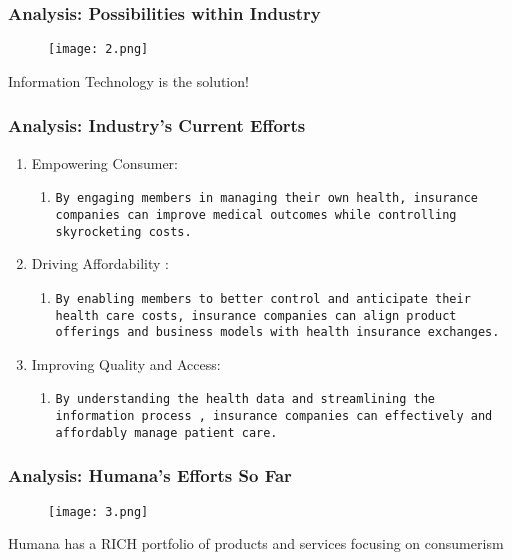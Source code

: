 \documentclass[compress,handout,10pt]{beamer}
\let\olditem\item
\renewcommand{\item}{\setlength{\itemsep}{0.5\baselineskip}\olditem}
\begin{document}
\begin{frame}[dresden]
   \frametitle{Analysis: Possibilities within Industry}
\begin{figure}[h]
    \begin{center}
        \texttt{[image: 2.png]}
    \end{center}
    \caption{}
    \label{fig:seats}
\end{figure}
    \begin{center}
Information Technology is the solution! 
   \end{center}
\end{frame}


\begin{frame}
    \frametitle{Analysis: Industry’s Current Efforts}
    \begin{enumerate}
        \item Empowering Consumer: 
            \begin{enumerate}
                \item \texttt{By engaging members in managing their own health, insurance companies can improve medical outcomes while controlling skyrocketing costs.}          
            \end{enumerate}
        \item Driving Affordability :
            \begin{enumerate}
                \item \texttt{By enabling members to better control and anticipate their health care costs, insurance companies can align product offerings and business models with health insurance exchanges.}
            \end{enumerate}
        \item Improving Quality and Access:
            \begin{enumerate}
                \item \texttt{By understanding the health data and streamlining the information process , insurance companies can effectively and affordably manage patient care.}
            \end{enumerate}
    \end{enumerate}
\end{frame}


\begin{frame}[dresden]
   \frametitle{Analysis: Humana’s Efforts So Far}
\begin{figure}[h]
    \begin{center}
        \texttt{[image: 3.png]}
    \end{center}
    \caption{}
    \label{fig:seats}
\end{figure}
    \begin{center}
Humana has a RICH portfolio of products and services focusing on consumerism
    \end{center}
\end{frame}
\end{document}
